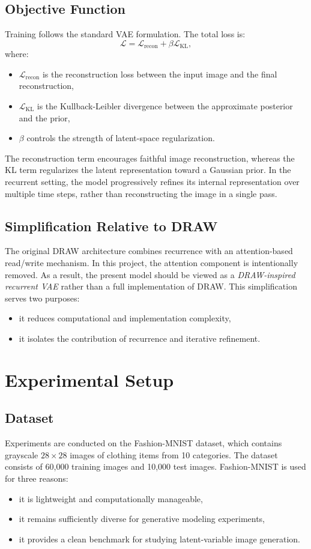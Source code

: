 \documentclass[11pt,a4paper]{article}
\begin{document}
\subsection{Objective Function}
Training follows the standard VAE formulation. The total loss is:
\[
\mathcal{L} = \mathcal{L}_{\text{recon}} + \beta \mathcal{L}_{\text{KL}},
\]
where:
\begin{itemize}
    \item $\mathcal{L}_{\text{recon}}$ is the reconstruction loss between the input image and the final reconstruction,
    \item $\mathcal{L}_{\text{KL}}$ is the Kullback-Leibler divergence between the approximate posterior and the prior,
    \item $\beta$ controls the strength of latent-space regularization.
\end{itemize}
The reconstruction term encourages faithful image reconstruction, whereas the KL term regularizes the latent representation toward a Gaussian prior. In the recurrent setting, the model progressively refines its internal representation over multiple time steps, rather than reconstructing the image in a single pass.
\subsection{Simplification Relative to DRAW}
The original DRAW architecture combines recurrence with an attention-based read/write mechanism. In this project, the attention component is intentionally removed. As a result, the present model should be viewed as a \emph{DRAW-inspired recurrent VAE} rather than a full implementation of DRAW.
This simplification serves two purposes:
\begin{itemize}
    \item it reduces computational and implementation complexity,
    \item it isolates the contribution of recurrence and iterative refinement.
\end{itemize}
\section{Experimental Setup}
\subsection{Dataset}
Experiments are conducted on the Fashion-MNIST dataset, which contains grayscale $28 \times 28$ images of clothing items from 10 categories. The dataset consists of 60,000 training images and 10,000 test images.
Fashion-MNIST is used for three reasons:
\begin{itemize}
    \item it is lightweight and computationally manageable,
    \item it remains sufficiently diverse for generative modeling experiments,
    \item it provides a clean benchmark for studying latent-variable image generation.
\end{itemize}
\end{document}
